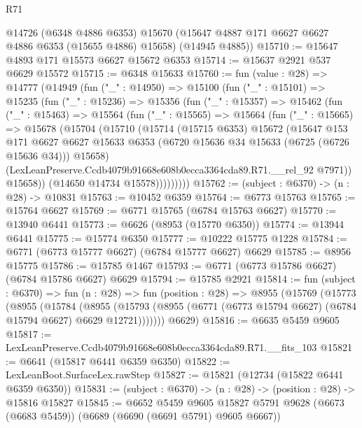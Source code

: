 \begin{lexlean}{R71}
\begin{coremodule}
      @14726
      (@6348 @4886 @6353)
      @15670
      (@15647 @4887 @171 @6627 @6627 @4886 @6353 (@15655 @4886) @15658)
      (@14945 @4885))
@15710 := @15647 @4893 @171 @15573 @6627 @15672 @6353
@15714 := @15637 @2921 @537 @6629 @15572
@15715 := @6348 @15633
@15760 := fun (value : @28) =>
  @14777
    (@14949
      (fun ("_" : @14950) =>
      @15100
        (fun ("_" : @15101) =>
        @15235
          (fun ("_" : @15236) =>
          @15356
            (fun ("_" : @15357) =>
            @15462
              (fun ("_" : @15463) =>
              @15564
                (fun ("_" : @15565) =>
                @15664
                  (fun ("_" : @15665) =>
                  @15678
                    (@15704
                      (@15710
                        (@15714
                          (@15715 @6353)
                          @15672
                          (@15647
                            @153
                            @171
                            @6627
                            @6627
                            @15633
                            @6353
                            (@6720 @15636 @34 @15633 (@6725 (@6726 @15636 @34)))
                            @15658)
                          (LexLeanPreserve.Ccdb4079b91668e608b0ecca3364cda89.R71.__rel_92 @7971))
                        @15658))
                    (@14650 @14734 @15578)))))))))
@15762 := (subject : @6370) -> (n : @28) -> @10831
@15763 := @10452 @6359
@15764 := @6773 @15763
@15765 := @15764 @6627
@15769 := @6771 @15765 (@6784 @15763 @6627)
@15770 := @13940 @6441
@15773 := @6626 (@8953 (@15770 @6350))
@15774 := @13944 @6441
@15775 := @15774 @6350
@15777 := @10222 @15775 @1228
@15784 := @6771 (@6773 @15777 @6627) (@6784 @15777 @6627) @6629
@15785 := @8956 @15775
@15786 := @15785 @1467
@15793 := @6771 (@6773 @15786 @6627) (@6784 @15786 @6627) @6629
@15794 := @15785 @2921
@15814 := fun (subject : @6370) =>
  fun (n : @28) =>
  fun (position : @28) =>
  @8955
    (@15769
      (@15773
        (@8955
          (@15784
            (@8955
              (@15793 (@8955 (@6771 (@6773 @15794 @6627) (@6784 @15794 @6627) @6629 @12721)))))))
      @6629)
@15816 := @6635 @5459 @9605
@15817 := LexLeanPreserve.Ccdb4079b91668e608b0ecca3364cda89.R71.__fits_103
@15821 := @6641 (@15817 @6441 @6359 @6350)
@15822 := LexLeanBoot.SurfaceLex.rawStep
@15827 := @15821 (@12734 (@15822 @6441 @6359 @6350))
@15831 := (subject : @6370) -> (n : @28) -> (position : @28) -> @15816 @15827
@15845 := @6652
    @5459
    @9605
    @15827
    @5791
    @9628
    (@6673 (@6683 @5459))
    (@6689 (@6690 (@6691 @5791) @9605 @6667))

\end{coremodule}
\end{lexlean}

